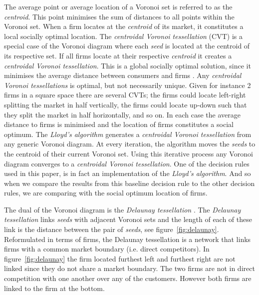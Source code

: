 \documentclass[preprint, 12pt]{elsarticle}
\begin{document}
The average point or average location of a Voronoi set is referred to as the \emph{centroid}. This point minimises the sum of distances to all points within the Voronoi set. When a firm locates at the \emph{centroid} of its market, it constitutes a local socially optimal location. The \emph{centroidal Voronoi tessellation} (CVT) is a special case of the Voronoi diagram where each \emph{seed} is located at the centroid of its respective set. If all firms locate at their respective \emph{centroid} it creates a \emph{centroidal Voronoi tessellation}. This is a global socially optimal solution, since it minimises the average distance between consumers and firms \citep{Laver_Sergenti_2011}. Any \emph{centroidal Voronoi tessellations} is optimal, but not necessarily unique. Given for instance 2 firms in a square space there are several CVTs; the firms could locate left-right splitting the market in half vertically, the firms could locate up-down such that they split the market in half horizontally, and so on. In each case the average distance to firms is minimised and the location of firms constitutes a social optimum. The \emph{Lloyd's algorithm} generates a \emph{centroidal Voronoi tessellation} from any generic Voronoi diagram. At every iteration, the algorithm moves the \emph{seeds} to the centroid of their current Voronoi set. Using this iterative process any Voronoi diagram converges to a \emph{centroidal Voronoi tessellation}. One of the decision rules used in this paper, is in fact an implementation of the \emph{Lloyd's algorithm}. And so when we compare the results from this baseline decision rule to the other decision rules, we are comparing with the social optimum location of firms.

The dual of the Voronoi diagram is the \emph{Delaunay tessellation} \citep[chapter~19]{Eiselt_Marianov_2011}. The \emph{Delaunay tessellation} links \emph{seeds} with adjacent Voronoi sets and the length of each of these link is the distance between the pair of \emph{seeds}, see figure~\ref{fig:delaunay}. Reformulated in terms of firms, the Delaunay tessellation is a network that links firms with a common market boundary (i.e. direct competitors). In figure~\ref{fig:delaunay} the firm located furthest left and furthest right are not linked since they do not share a market boundary. The two firms are not in direct competition with one another over any of the customers. However both firms are linked to the firm at the bottom.
\end{document}
